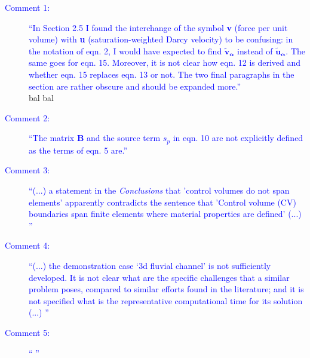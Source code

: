 \documentclass[12pts,a4paper,amsmath,amssymb,floatfix]{article}
\newcommand{\blue}{\textcolor{blue}}
\begin{document}
\begin{description}
\item[\blue{Comment 1:}] \blue{``In Section 2.5 I found the interchange of the symbol {\bf v} (force per unit volume) with {\bf u} (saturation-weighted Darcy velocity) to be confusing: in the notation of eqn. 2, I would have expected to find $\mathbf{\tilde{v}_{\alpha}}$ instead of $\mathbf{\tilde{u}_{\alpha}}$. The same goes for eqn. 15. Moreover, it is not clear how eqn. 12 is derived and whether eqn. 15 replaces eqn. 13 or not. The two final paragraphs in the section are rather obscure and should be expanded more.''}\\
 bal bal
\item[\blue{Comment 2:}] \blue{``The matrix $\mathbf{B}$ and the source term $s_{p}$ in eqn. 10 are not explicitly defined as the terms of eqn. 5 are.''}\\
\item[\blue{Comment 3:}] \blue{``(...) a statement in the {\it Conclusions} that 'control volumes do not span elements' apparently contradicts the sentence that 'Control volume (CV) boundaries span finite elements where material properties	are defined' (...) ''}\\
\item[\blue{Comment 4:}] \blue{``(...) the demonstration case `3d fluvial channel' is not sufficiently developed. It is not clear what are the specific challenges that a similar problem poses, compared to similar efforts found in the literature; and it is not specified what is the representative computational time for its solution (...) ''}\\
\item[\blue{Comment 5:}] \blue{``
''}\\

\end{description}
\end{document}
